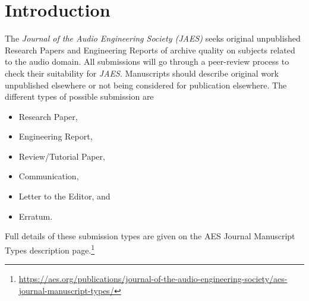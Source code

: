 \documentclass[fleqn,draft]{jaes}
\begin{document}
\section{Introduction}
The \emph{Journal of the Audio Engineering Society (JAES)} seeks original unpublished Research Papers and Engineering Reports of archive quality on subjects related to the audio domain. All submissions will go through a peer-review process to check their suitability for \emph{JAES}. Manuscripts should describe original work unpublished elsewhere or not being considered for publication elsewhere. The different types of possible submission are
\begin{itemize}
    \item Research Paper,
    \item Engineering Report,
    \item Review/Tutorial Paper, 
    \item Communication, 
    \item Letter to the Editor, and
    \item Erratum.
\end{itemize}

Full details of these submission types are given on the AES Journal Manuscript Types description page.\footnote{\url{https://aes.org/publications/journal-of-the-audio-engineering-society/aes-journal-manuscript-types/}} 
\end{document}
